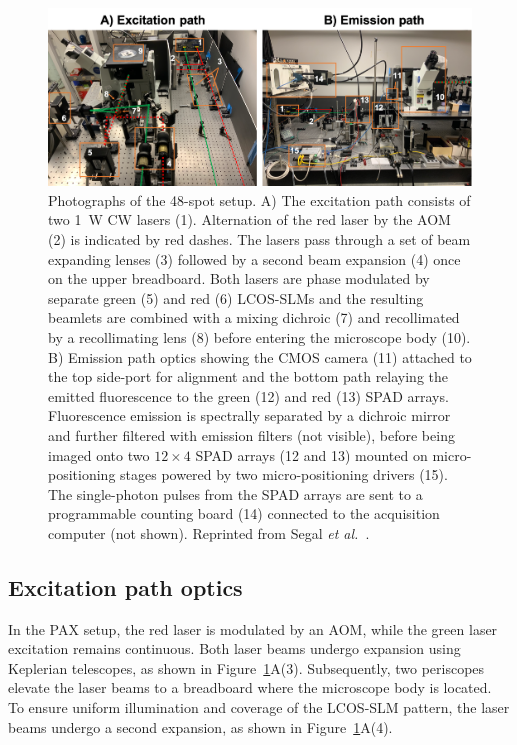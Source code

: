 \begin{figure}
\centering\includegraphics[width=1.0\linewidth]{chapters/figures/setup_photos.png}
\caption{\label{fig:setup_photos} Photographs of the 48-spot setup.
A) The excitation path consists of two 1~W \ac{CW} lasers (1). 
Alternation of the red laser by the \ac{AOM} (2) is indicated by red dashes. 
The lasers pass through a set of beam expanding lenses (3) followed by a second beam expansion (4) once on the upper breadboard.
Both lasers are phase modulated by separate green (5) and red (6) \ac{LCOS-SLM}s and the resulting beamlets are combined with a mixing dichroic (7) and recollimated by a recollimating lens (8) before entering the microscope body (10). 
B) Emission path optics showing the \ac{CMOS} camera (11) attached to the top side-port for alignment and the bottom path relaying the emitted fluorescence to the green (12) and red (13) \ac{SPAD} arrays. 
Fluorescence emission is spectrally separated by a dichroic mirror and further filtered with emission filters (not visible), before being imaged onto two $12\times4$ \ac{SPAD} arrays (12 and 13)  mounted on micro-positioning stages powered by two micro-positioning drivers (15).
The single-photon pulses from the \ac{SPAD} arrays are sent to a programmable counting board (14) connected to the acquisition computer (not shown).
Reprinted from Segal \textit{et al.}~\cite{segal_methods_2019}.
}
\end{figure}

\subsection{Excitation path optics}
\label{sec:excitation_optics}

In the \ac{PAX} setup, the red laser is modulated by an \ac{AOM}, while the green laser excitation remains continuous. 
Both laser beams undergo expansion using Keplerian telescopes, as shown in Figure~\ref{fig:setup_photos}A(3). 
Subsequently, two periscopes elevate the laser beams to a breadboard where the microscope body is located. 
To ensure uniform illumination and coverage of the \ac{LCOS-SLM} pattern, the laser beams undergo a second expansion, as shown in Figure~\ref{fig:setup_photos}A(4). 

